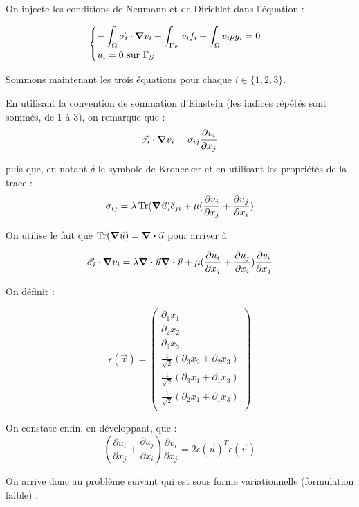 On injecte les conditions de Neumann et de Dirichlet dans l'équation : %

\begin{equation}
    \begin{cases}
        -\displaystyle\int_{\Omega} \vec{\sigma_i} \cdot \grad v_i + \int_{\Gamma_F} v_i f_i + \int_\Omega v_i \rho g_i = 0\\
        u_i = 0 \textrm{ sur } \Gamma_S
    \end{cases}
\end{equation}

Sommons maintenant les trois équations pour chaque $i \in \{1,2,3\}$.

En utilisant la convention de sommation d'Einstein (les indices répétés sont sommés, de $1$ à $3$), on remarque que :
$$
\vec{\sigma_i} \cdot \grad v_i = \sigma_{ij} \frac{\partial v_i}{\partial x_j}
$$

puis que, en notant $\delta$ le symbole de Kronecker et en utilisant les propriétés de la trace :
$$
\sigma_{ij} = \lambda \operatorname{Tr}(\grad \vec{u}) \delta_{ji} + \mu (\frac{\partial u_i}{\partial x_j} + \frac{\partial u_j}{\partial x_i})
$$

On utilise le fait que $\operatorname{Tr}(\grad \vec{u}) = \div \vec{u}$ pour arriver à 

$$
\vec{\sigma_i} \cdot \grad v_i = \lambda \div \vec{u} \div \vec{v} + \mu (\frac{\partial u_i}{\partial x_j} + \frac{\partial u_j}{\partial x_i})\frac{\partial v_i}{\partial x_j}
$$

On définit :

$$
\epsilon(\vec{x})=
\begin{pmatrix}
    \partial_1 x_1\\
    \partial_2 x_2\\ 
    \partial_3 x_3\\
    \frac{1}{\sqrt{2}}(\partial_3 x_2 + \partial_2 x_3)\\
    \frac{1}{\sqrt{2}}(\partial_3 x_1 + \partial_1 x_3)\\
    \frac{1}{\sqrt{2}}(\partial_2 x_1 + \partial_1 x_3)\\
\end{pmatrix}
$$

On constate enfin, en développant, que :
$$
(\frac{\partial u_i}{\partial x_j} + \frac{\partial u_j}{\partial x_i})\frac{\partial v_i}{\partial x_j} = 2\epsilon(\vec{u})^T\epsilon(\vec{v})
$$

On arrive donc au problème suivant qui est sous forme variationnelle (formulation faible)  :

